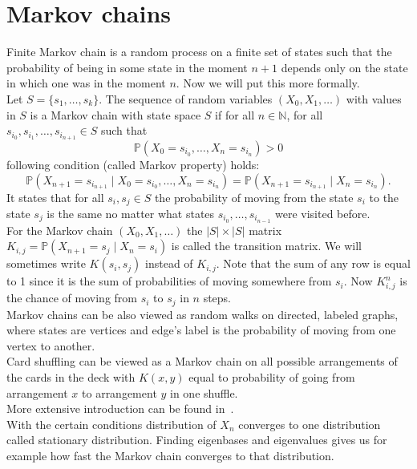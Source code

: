 \documentclass[a4paper, 12pt]{article}
\begin{document}
\section{Markov chains}
\setcounter{page}{5}
Finite Markov chain is a random process on a finite set of states such that
the probability of being in some state in the moment $n+1$ depends only on the state in which one was
in the moment $n$. Now we will put this more formally.\\
Let $S = \{s_1, \dots, s_k\}$. The sequence of random variables $(X_0, X_1, \dots)$ with values in $S$
is a Markov chain with state space $S$ if for all $n \in \mathbb{N}$,
for all $s_{i_0}, s_{i_1}, \dots, s_{i_{n+1}} \in S$ such that
\begin{equation*}
\mathbb{P}(X_0 = s_{i_0}, \dots, X_n = s_{i_n}) > 0
\end{equation*}
following condition (called Markov property) holds:
\begin{equation}
\mathbb{P}(X_{n+1} = s_{i_{n+1}} \mid X_0 = s_{i_0}, \dots, X_n = s_{i_n}) =
\mathbb{P}(X_{n+1} = s_{i_{n+1}} \mid X_n = s_{i_n}).
\end{equation}
It states that for all $s_i, s_j \in S$ the probability of moving from the state
$s_i$ to the state $s_j$ is the same no matter what states $s_{i_0}, \dots, s_{i_{n-1}}$
were visited before. \\
For the Markov chain $(X_0, X_1, \dots)$ the $|S| \times |S|$ matrix
$K_{i,j} = \mathbb{P}(X_{n+1} = s_j \mid X_n = s_i)$ is called the transition matrix. We will sometimes
write $K(s_i, s_j)$ instead of $K_{i,j}$. Note that the sum of
any row is equal to 1 since it is the sum of probabilities of moving somewhere from $s_i$.
Now $K^n_{i,j}$ is the chance of moving from $s_i$ to $s_j$ in $n$ steps. \\
Markov chains can be also viewed as random walks on directed, labeled graphs, where states are vertices
and edge's label is the probability of moving from one vertex to another. \\
Card shuffling can be viewed as a Markov chain on all possible arrangements of the cards
in the deck with $K(x,y)$ equal to probability of going from arrangement $x$ to arrangement $y$ in one
shuffle.
\\ More extensive introduction can be found in~\cite{LePeWi}. \\
With the certain conditions distribution of $X_n$ converges to one distribution called stationary
distribution. Finding eigenbases and eigenvalues gives us for example how fast the Markov chain converges
to that
distribution.
\end{document}
